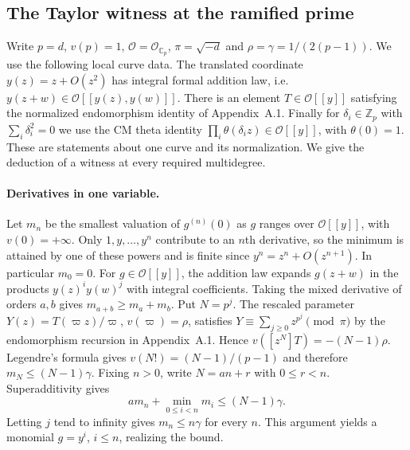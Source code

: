 \subsection{The Taylor witness at the ramified prime}
\label{sec:ramified-witness}

Write $p=d$, $v(p)=1$, $\mathcal O=\mathcal O_{\mathbb C_p}$,
$\pi=\sqrt{-d}$ and $\rho=\gamma=1/(2(p-1))$.
We use the following local curve data. The translated coordinate $y(z)=z+O(z^2)$
has integral formal addition law, i.e.$y(z+w)\in\mathcal O[[y(z),y(w)]]$. There is an element
$T\in\mathcal O[[y]]$ satisfying the normalized endomorphism identity
of Appendix~A.1. Finally for $\delta_i\in\mathbb Z_p$ with
$\sum_i\delta_i^2=0$ we use the CM theta identity
$\prod_i\theta(\delta_i z)\in\mathcal O[[y]]$, with $\theta(0)=1$.
These are statements about one curve and its normalization.
We give the deduction of a witness at every required multidegree.

\paragraph{Derivatives in one variable.}
Let $m_n$ be the smallest valuation of $g^{(n)}(0)$ as
$g$ ranges over $\mathcal O[[y]]$, with $v(0)=+\infty$.
Only $1,y,\ldots,y^n$ contribute to an $n$th derivative, so the minimum
is attained by one of these powers and is finite since $y^n=z^n+O(z^{n+1})$.
In particular $m_0=0$. For $g\in\mathcal O[[y]]$, the addition law expands
$g(z+w)$ in the products $y(z)^i y(w)^j$ with integral coefficients.
Taking the mixed derivative of orders $a,b$ gives
$m_{a+b}\ge m_a+m_b$.
Put $N=p^j$. The rescaled parameter
$Y(z)=T(\varpi z)/\varpi$, $v(\varpi)=\rho$, satisfies
$Y\equiv\sum_{j\ge0} z^{p^j}\pmod{\pi}$ by the endomorphism recursion in
Appendix~A.1. Hence $v([z^N]T)=-(N-1)\rho$.
Legendre's formula gives $v(N!)=(N-1)/(p-1)$ and therefore
$m_N\le (N-1)\gamma$. Fixing $n>0$, write $N=an+r$ with $0\le r<n$.
Superadditivity gives
\[
 a m_n+\min_{0\le i<n}m_i\le (N-1)\gamma.
\]
Letting $j$ tend to infinity gives $m_n\le n\gamma$ for every $n$.
This argument yields a monomial $g=y^i$, $i\le n$, realizing the bound.

